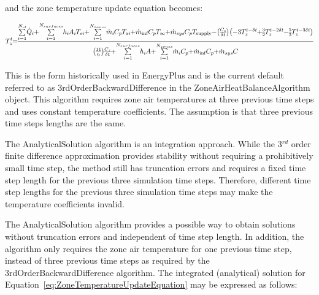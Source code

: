 and the zone temperature update equation becomes:

\begin{equation}
\medmuskip=0mu
\thinmuskip=0mu
\thickmuskip=0mu
\nulldelimiterspace=0pt
\scriptspace=0pt
T_z^t = \frac{{\sum\limits_{i = 1}^{{N_{sl}}} {{{\dot Q}_i}}  + \sum\limits_{i = 1}^{{N_{surfaces}}} {{h_i}} {A_i}{T_{si}} + \sum\limits_{i = 1}^{{N_{zones}}} {{{\dot m}_i}} {C_p}{T_{zi}}\, + {{\dot m}_{\inf }}{C_p}{T_\infty } + {{\dot m}_{sys}}{C_p}{T_{{\rm{supply}}}} - \left( {\frac{{{C_z}}}{{\delta t}}} \right)\left( { - 3T_z^{t - \delta t} + \frac{3}{2}T_z^{t - 2\delta t} - \frac{1}{3}T_z^{t - 3\delta t}} \right)}}{{\left( {\frac{{11}}{6}} \right)\frac{{{C_z}}}{{\delta t}} + \sum\limits_{i = 1}^{{N_{surfaces}}} {{h_i}} A + \sum\limits_{i = 1}^{{N_{zones}}} {{{\dot m}_i}} {C_p} + {{\dot m}_{\inf }}{C_p} + {{\dot m}_{sys}}C}}
\label{eq:ZoneTemperatureUpdateEquation}
\end{equation}

This is the form historically used in EnergyPlus and is the current default referred to as 3rdOrderBackwardDifference in the ZoneAirHeatBalanceAlgorithm object. This algorithm requires zone air temperatures at three previous time steps and uses constant temperature coefficients. The assumption is that three previous time steps lengths are the same.

The AnalyticalSolution algorithm is an integration approach. While the 3\(^{rd}\) order finite difference approximation provides stability without requiring a prohibitively small time step, the method still has truncation errors and requires a fixed time step length for the previous three simulation time steps. Therefore, different time step lengths for the previous three simulation time steps may make the temperature coefficients invalid.

The AnalyticalSolution algorithm provides a possible way to obtain solutions without truncation errors and independent of time step length. In addition, the algorithm only requires the zone air temperature for one previous time step, instead of three previous time steps as required by the 3rdOrderBackwardDifference algorithm. The integrated (analytical) solution for Equation~\ref{eq:ZoneTemperatureUpdateEquation} may be expressed as follows:

